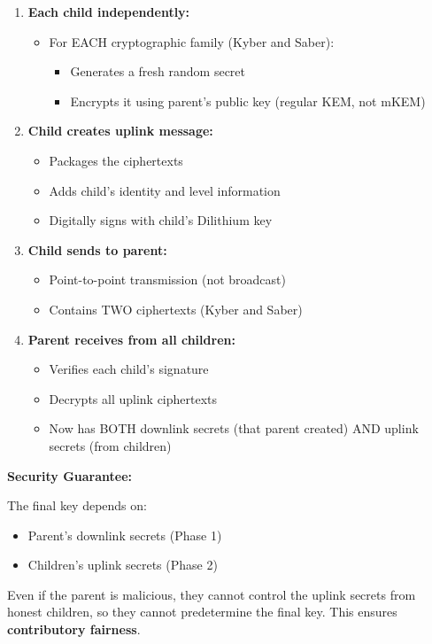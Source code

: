 \documentclass[12pt,a4paper]{report}
\begin{document}
\begin{enumerate}
\item \textbf{Each child independently:}
\begin{itemize}
\item For EACH cryptographic family (Kyber and Saber):
\begin{itemize}
\item Generates a fresh random secret
\item Encrypts it using parent's public key (regular KEM, not mKEM)
\end{itemize}
\end{itemize}

\item \textbf{Child creates uplink message:}
\begin{itemize}
\item Packages the ciphertexts
\item Adds child's identity and level information
\item Digitally signs with child's Dilithium key
\end{itemize}

\item \textbf{Child sends to parent:}
\begin{itemize}
\item Point-to-point transmission (not broadcast)
\item Contains TWO ciphertexts (Kyber and Saber)
\end{itemize}

\item \textbf{Parent receives from all children:}
\begin{itemize}
\item Verifies each child's signature
\item Decrypts all uplink ciphertexts
\item Now has BOTH downlink secrets (that parent created) AND uplink secrets (from children)
\end{itemize}
\end{enumerate}

\textbf{Security Guarantee:}

The final key depends on:
\begin{itemize}
\item Parent's downlink secrets (Phase 1)
\item Children's uplink secrets (Phase 2)
\end{itemize}

Even if the parent is malicious, they cannot control the uplink secrets from honest children, so they cannot predetermine the final key. This ensures \textbf{contributory fairness}.
\end{document}
